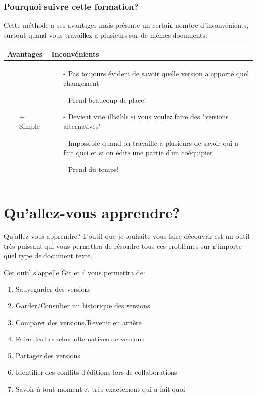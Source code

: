 \documentclass{beamer}
\begin{document}
\begin{frame}
\frametitle{Pourquoi suivre cette formation?}
Cette méthode a ses avantages mais présente un certain nombre d'inconvénients, surtout quand vous travaillez à plusieurs sur de mêmes documents:\\
\medskip

\begin{tabular}{ | m{6em} | m{18em} | }
    \hline
    
    \textbf{Avantages} & \textbf{Inconvénients}\\
        
    \hline
    \begin{itemize}
    \item[+] Simple
    \end{itemize}
    & 
    \begin{itemize}
    \item[-] Pas toujours évident de savoir quelle version a apporté quel changement
    \item[-] Prend beaucoup de place!
    \item[-] Devient vite illisible si vous voulez faire des "versions alternatives"
    \item[-] Impossible quand on travaille à plusieurs de savoir qui a fait quoi et si on édite une partie d'un coéquipier
    \item[-] Prend du temps!
    \end{itemize}\\
    \hline
\end{tabular}


\end{frame}


\section{Qu'allez-vous apprendre?}
\begin{frame}{Qu'allez-vous apprendre?}
L'outil que je souhaite vous faire découvrir est un outil très puissant qui vous permettra de résoudre tous ces problèmes sur n'importe quel type de document texte.\\
\medskip

Cet outil s'appelle Git et il vous permettra de:
\begin{enumerate}
    \item Sauvegarder des versions
    \item Garder/Consulter un historique des versions 
    \item Comparer des versions/Revenir en arrière
    \item Faire des branches alternatives de versions
    \item Partager des versions
    \item Identifier des conflits d'éditions lors de collaborations
    \item Savoir à tout moment et très exactement qui a fait quoi
\end{enumerate}
\end{frame}
\end{document}
